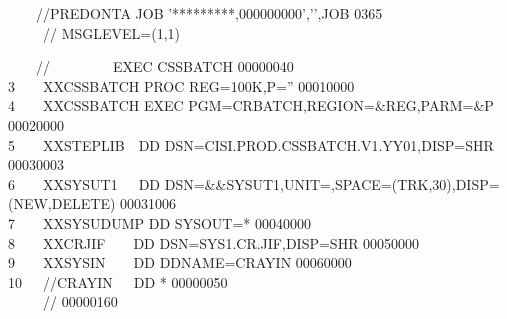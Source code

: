

{\scriptsize{}~~~~//PREDONTA JOB '*********,000000000','\hspace{7em}',\hfill JOB 0365\\
~~~~~// MSGLEVEL=(1,1)}

{\scriptsize{}~~~~//~~~~~~~~~EXEC CSSBATCH \hfill 00000040\\
3~~~~XXCSSBATCH PROC REG=100K,P='' \hfill 00010000\\
4~~~~XXCSSBATCH EXEC PGM=CRBATCH,REGION=\&REG,PARM=\&P \hfill 00020000\\
5~~~~XXSTEPLIB~~DD DSN=CISI.PROD.CSSBATCH.V1.YY01,DISP=SHR \hfill 00030003\\
6~~~~XXSYSUT1~~~DD DSN=\&\&SYSUT1,UNIT=,SPACE=(TRK,30),DISP=(NEW,DELETE) \hfill 00031006\\
7~~~~XXSYSUDUMP DD SYSOUT=* \hfill 00040000\\
8~~~~XXCRJIF~~~~DD DSN=SYS1.CR.JIF,DISP=SHR \hfill 00050000\\
9~~~~XXSYSIN~~~~DD DDNAME=CRAYIN \hfill 00060000\\
10~~~//CRAYIN~~~DD * \hfill 00000050\\
~~~~~// \hfill 00000160}




